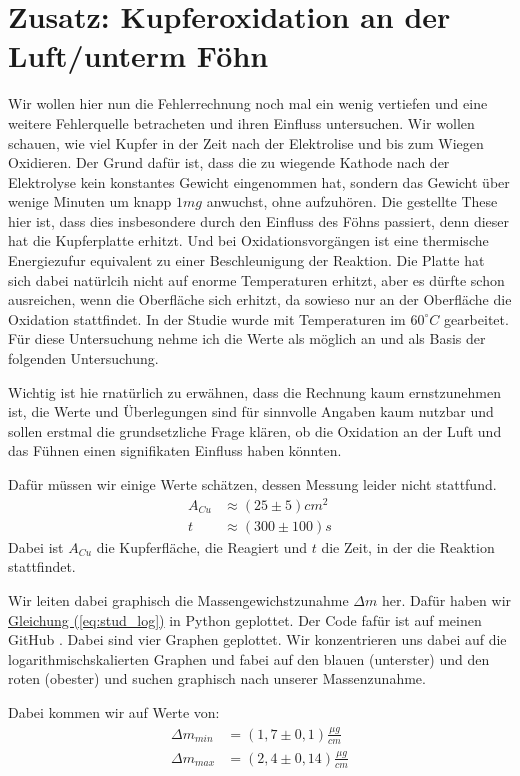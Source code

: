 \section{Zusatz: Kupferoxidation an der Luft/unterm Föhn}
Wir wollen hier nun die Fehlerrechnung noch mal ein wenig vertiefen und eine weitere Fehlerquelle betracheten und ihren Einfluss untersuchen. Wir wollen schauen, wie viel Kupfer in der Zeit nach der Elektrolise und bis zum Wiegen Oxidieren.
Der Grund dafür ist, dass die zu wiegende Kathode nach der Elektrolyse kein konstantes Gewicht eingenommen hat, sondern das Gewicht über wenige Minuten um knapp $1mg$ anwuchst, ohne aufzuhören.
Die gestellte These hier ist, dass dies insbesondere durch den Einfluss des Föhns passiert, denn dieser hat die Kupferplatte erhitzt. Und bei Oxidationsvorgängen ist eine thermische Energiezufur equivalent zu einer Beschleunigung der Reaktion.
Die Platte hat sich dabei natürlcih nicht auf enorme Temperaturen erhitzt, aber es dürfte schon ausreichen, wenn die Oberfläche sich erhitzt, da sowieso nur an der Oberfläche die Oxidation stattfindet. In der Studie \cite{KupferStudie}
wurde mit Temperaturen im $60^\circ C$ gearbeitet. Für diese Untersuchung nehme ich die Werte als möglich an und als Basis der folgenden Untersuchung.

Wichtig ist hie rnatürlich zu erwähnen, dass die Rechnung kaum ernstzunehmen ist, die Werte und Überlegungen sind für sinnvolle Angaben kaum nutzbar und sollen erstmal die grundsetzliche Frage klären, ob die Oxidation an der Luft und das Fühnen einen signifikaten Einfluss haben könnten.

Dafür müssen wir einige Werte schätzen, dessen Messung leider nicht stattfund.
\begin{align}
    A_{Cu} &\approx (25 \pm 5)cm^2 \\
    t &\approx (300\pm100)s
\end{align}
Dabei ist $A_{Cu}$ die Kupferfläche, die Reagiert und $t$ die Zeit, in der die Reaktion stattfindet.

Wir leiten dabei graphisch die Massengewichstzunahme $\Delta m$ her. Dafür haben wir \hyperref[eq:stud_log]{Gleichung (\ref*{eq:stud_log})} in Python geplottet. Der Code fafür ist auf meinen GitHub \cite{githubPAP1}. 
Dabei sind vier Graphen geplottet. Wir konzentrieren uns dabei auf die logarithmischskalierten Graphen und fabei auf den blauen (unterster) und den roten (obester) und suchen graphisch nach unserer Massenzunahme. 

Dabei kommen wir auf Werte von:
\begin{align}
    \Delta m_{min} &= (1,7 \pm 0,1)\frac{\mu g}{cm} \\
    \Delta m_{max} &= (2,4 \pm 0,14)\frac{\mu g}{cm}
\end{align}